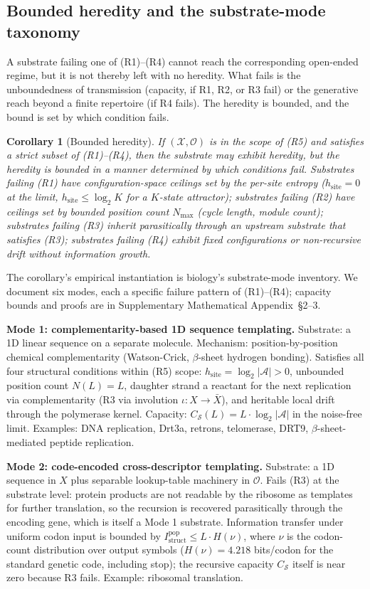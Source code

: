 \documentclass[aps,prx,reprint,amsmath,amssymb,floatfix,superscriptaddress,nofootinbib]{revtex4-2}
\theoremstyle{plain-thm}
\newtheorem{corollary}{Corollary}
\theoremstyle{definition-thm}
\newcommand{\Istructpop}{I_{\mathrm{struct}}^{\mathrm{pop}}}
\newcommand{\Csub}{C_{\mathcal{S}}}
\newcommand{\Xset}{\mathcal{X}}
\newcommand{\Op}{\mathcal{O}}
\begin{document}
\subsection{Bounded heredity and the substrate-mode taxonomy}

A substrate failing one of (R1)--(R4) cannot reach the corresponding open-ended regime, but it is not thereby left with no heredity. What fails is the unboundedness of transmission (capacity, if R1, R2, or R3 fail) or the generative reach beyond a finite repertoire (if R4 fails). The heredity is bounded, and the bound is set by which condition fails.

\begin{corollary}[Bounded heredity]
\label{cor:bounded}
If $(\Xset, \Op)$ is in the scope of (R5) and satisfies a strict subset of \textnormal{(R1)--(R4)}, then the substrate may exhibit heredity, but the heredity is bounded in a manner determined by which conditions fail. Substrates failing (R1) have configuration-space ceilings set by the per-site entropy ($h_{\mathrm{site}} = 0$ at the limit, $h_{\mathrm{site}} \le \log_2 K$ for a $K$-state attractor); substrates failing (R2) have ceilings set by bounded position count $N_{\max}$ (cycle length, module count); substrates failing (R3) inherit parasitically through an upstream substrate that satisfies (R3); substrates failing (R4) exhibit fixed configurations or non-recursive drift without information growth.
\end{corollary}

The corollary's empirical instantiation is biology's substrate-mode inventory. We document six modes, each a specific failure pattern of (R1)--(R4); capacity bounds and proofs are in Supplementary Mathematical Appendix~\S2--3.

\textbf{Mode 1: complementarity-based 1D sequence templating.} Substrate: a 1D linear sequence on a separate molecule. Mechanism: position-by-position chemical complementarity (Watson-Crick, $\beta$-sheet hydrogen bonding). Satisfies all four structural conditions within (R5) scope: $h_{\mathrm{site}} = \log_2 |\mathcal{A}| > 0$, unbounded position count $N(L) = L$, daughter strand a reactant for the next replication via complementarity (R3 via involution $\iota: X \to \bar{X}$), and heritable local drift through the polymerase kernel. Capacity: $\Csub(L) = L \cdot \log_2 |\mathcal{A}|$ in the noise-free limit. Examples: DNA replication, Drt3a, retrons, telomerase, DRT9, $\beta$-sheet-mediated peptide replication.

\textbf{Mode 2: code-encoded cross-descriptor templating.} Substrate: a 1D sequence in $X$ plus separable lookup-table machinery in $\Op$. Fails (R3) at the substrate level: protein products are not readable by the ribosome as templates for further translation, so the recursion is recovered parasitically through the encoding gene, which is itself a Mode 1 substrate. Information transfer under uniform codon input is bounded by $\Istructpop \le L \cdot H(\nu)$, where $\nu$ is the codon-count distribution over output symbols ($H(\nu) = 4.218$ bits/codon for the standard genetic code, including stop); the recursive capacity $\Csub$ itself is near zero because R3 fails. Example: ribosomal translation.
\end{document}
